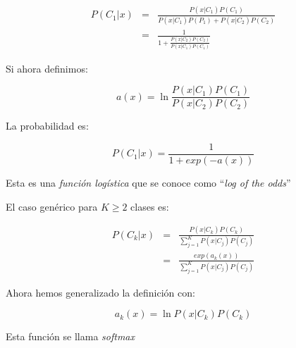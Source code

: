 \begin{eqnarray*}
  P(C_1 | x)
  &=&
  \frac{P(x | C_1) P(C_1)}
  {
  P(x | C_1)P(P_1) + P(x | C_2)P(C_2)
  } \\
  &=&
  \frac{1}
  {
  1 + \frac
  {P(x | C_2)P(C_2)}
  {P(x | C_1)P(C_1)}
  }
\end{eqnarray*}

Si ahora definimos:

\begin{equation*}
  a(x) = \ln
  \frac
  {P(x | C_1)P(C_1)}
  {P(x | C_2)P(C_2)}
\end{equation*}

La probabilidad es:

\begin{equation*}
  P(C_1 | x) = \frac{1}
  {1 + exp(-a(x))}
\end{equation*}

Esta es una \textit{función logística} que se conoce como
``\textit{log of the odds}''

El caso genérico para $K \geq 2$ clases es:

\begin{eqnarray*}
  P(C_k | x)
  &=&
  \frac
  {P(x | C_k)P(C_k)}
  {
  \sum_{j = 1}^{K} P(x | C_j)P(C_j)
  } \\
  &=&
  \frac
  {exp(a_k(x))}
  {\sum_{j = 1}^{K} P(x | C_j)P(C_j)}
\end{eqnarray*}

Ahora hemos generalizado la definición con:

\begin{equation*}
  a_k(x) = \ln
  P(x | C_k)P(C_k)
\end{equation*}


Esta función se llama \textit{softmax}

